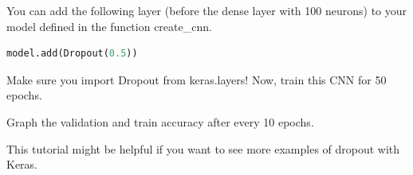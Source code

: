 \documentclass[10pt, a4paper]{article}
\begin{document}
\begin{Problem*}
You can add the following layer (before the dense layer with 100 neurons) to your model defined in the function create\_cnn.

\begin{lstlisting}[language=Python]
model.add(Dropout(0.5))
\end{lstlisting}
Make sure you import Dropout from keras.layers! Now, train this CNN for 50 epochs.

Graph the validation and train accuracy after every 10 epochs.

This tutorial might be helpful if you want to see more examples of dropout with Keras.
\end{Problem*}
\end{document}
